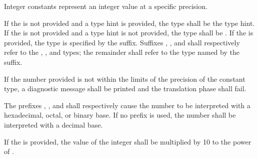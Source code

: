 Integer constants represent an integer value at a specific precision.

\specsubitem
If the  is not provided and a type hint is provided,
the type shall be the type hint. If the  is not
provided and a type hint is not provided, the type shall be . If
the  is provided, the type is specified by the
suffix. Suffixes , ,  and  shall
respectively refer to the , , and 
types; the remainder shall refer to the type named by the suffix.

\specsubitem
If the number provided is not within the limits of the precision of the
constant type, a diagnostic message shall be printed and the translation phase
shall fail.

\specsubitem
The prefixes , , and  shall respectively
cause the number to be interpreted with a hexadecimal, octal, or binary base.
If no prefix is used, the number shall be interpreted with a decimal base.

\specsubitem
If the  is provided, the value of the
integer shall be multiplied by 10 to the power of .

